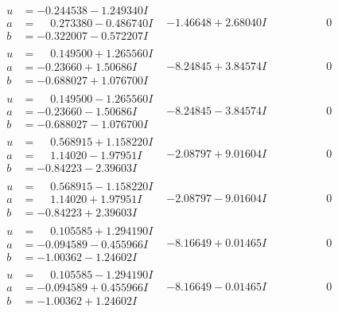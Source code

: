 \documentclass[1p]{elsarticle_modified}
\theoremstyle{definition}
\begin{document}
$$\begin{array}{c|c|c}
\begin{aligned}
u &= -0.244538 - 1.249340 I \\
a &= \phantom{-}0.273380 - 0.486740 I \\
b &= -0.322007 - 0.572207 I\end{aligned}
 & -1.46648 + 2.68040 I & \phantom{-0.000000 } 0 \\ \hline\begin{aligned}
u &= \phantom{-}0.149500 + 1.265560 I \\
a &= -0.23660 + 1.50686 I \\
b &= -0.688027 + 1.076700 I\end{aligned}
 & -8.24845 + 3.84574 I & \phantom{-0.000000 } 0 \\ \hline\begin{aligned}
u &= \phantom{-}0.149500 - 1.265560 I \\
a &= -0.23660 - 1.50686 I \\
b &= -0.688027 - 1.076700 I\end{aligned}
 & -8.24845 - 3.84574 I & \phantom{-0.000000 } 0 \\ \hline\begin{aligned}
u &= \phantom{-}0.568915 + 1.158220 I \\
a &= \phantom{-}1.14020 - 1.97951 I \\
b &= -0.84223 - 2.39603 I\end{aligned}
 & -2.08797 + 9.01604 I & \phantom{-0.000000 } 0 \\ \hline\begin{aligned}
u &= \phantom{-}0.568915 - 1.158220 I \\
a &= \phantom{-}1.14020 + 1.97951 I \\
b &= -0.84223 + 2.39603 I\end{aligned}
 & -2.08797 - 9.01604 I & \phantom{-0.000000 } 0 \\ \hline\begin{aligned}
u &= \phantom{-}0.105585 + 1.294190 I \\
a &= -0.094589 - 0.455966 I \\
b &= -1.00362 - 1.24602 I\end{aligned}
 & -8.16649 + 0.01465 I & \phantom{-0.000000 } 0 \\ \hline\begin{aligned}
u &= \phantom{-}0.105585 - 1.294190 I \\
a &= -0.094589 + 0.455966 I \\
b &= -1.00362 + 1.24602 I\end{aligned}
 & -8.16649 - 0.01465 I & \phantom{-0.000000 } 0\\

\end{array}$$
\end{document}
